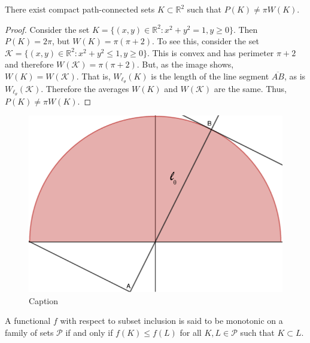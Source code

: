 \documentclass[crop=false,class=book,oneside]{standalone}
\begin{document}
            \begin{theorem}
            There exist compact path-connected sets $K\subset \mathbb{R}^2$ such that $P(K) \ne \pi W(K)$.
            \end{theorem}
            \begin{proof}
                Consider the set
                $K=\{(x,y)\in\mathbb{R}^{2}:x^{2}+y^{2}=1,y\geq 0\}$.
                Then $P(K)=2\pi$, but $W(K)=\pi(\pi+2)$. To see this, consider the
                set $\mathcal{K}=\{(x,y)\in\mathbb{R}^2:x^{2}+y^{2}\leq{1},y\geq{0}\}$.
                This is convex and has perimeter $\pi+2$ and therefore
                $W(\mathcal{K})=\pi(\pi+2)$. But, as the image shows,
                $W(K) = W(\mathcal{K})$. That is, $W_{\ell_{\theta}}(K)$ is
                the length of the line segment $\overline{AB}$, as is
                $W_{\ell_{\theta}}(\mathcal{K})$. Therefore the averages
                $W(K)$ and $W(\mathcal{K})$ are the same. Thus, $P(K)\ne\pi{W}(K)$.
            \end{proof}
            \begin{figure}[H]
                \centering
                \captionsetup{type=figure}
                \includegraphics[scale=0.3]{semicircle-1.png}
                \caption{Caption}
                \label{fig:my_label}
            \end{figure}
            \begin{definition}
            A functional $f$ with respect to subset inclusion is said to be monotonic on a family of sets $\mathscr{P}$ if and only if $f(K)\leq f(L)$ for all $K,L \in \mathscr{P}$ such that $K\subset L$.
            \end{definition}
\end{document}
